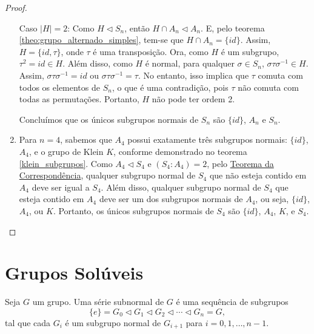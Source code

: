 \documentclass[11pt,openany]{book}
\newenvironment{novo}{
    \color{red}
}{}
\begin{document}
\begin{novo}
\begin{proof}
\begin{enumerate}[label=\alph*)]
        Caso $|H| = 2$: Como $H \triangleleft S_n$, então $H \cap A_n \triangleleft A_n$. E, pelo teorema \ref{theo:grupo_alternado_simples}, tem-se que $H \cap A_n = \{id\}$. Assim, $H = \{id, \tau\}$, onde $\tau$ é uma transposição. Ora, como $H$ é um subgrupo, $\tau^2 = id \in H$. Além disso, como $H$ é normal, para qualquer $\sigma \in S_n$, $\sigma \tau \sigma^{-1} \in H$. Assim, $\sigma \tau \sigma^{-1} = id$ ou $\sigma \tau \sigma^{-1} = \tau$. No entanto, isso implica que $\tau$ comuta com todos os elementos de $S_n$, o que é uma contradição, pois $\tau$ não comuta com todas as permutações. Portanto, $H$ não pode ter ordem 2.

        Concluímos que os únicos subgrupos normais de $S_n$ são $\{id\}$, $A_n$ e $S_n$.

        \item Para $n = 4$, sabemos que $A_4$ possui exatamente três subgrupos normais: $\{id\}$, $A_4$, e o grupo de Klein $K$, conforme demonstrado no teorema \ref{klein_subgrupos}. Como $A_4 \triangleleft S_4$ e $(S_4:A_4) = 2$, pelo \hyperref[theo:teorema_da_correspondencia]{Teorema da Correspondência}, qualquer subgrupo normal de $S_4$ que não esteja contido em $A_4$ deve ser igual a $S_4$. Além disso, qualquer subgrupo normal de $S_4$ que esteja contido em $A_4$ deve ser um dos subgrupos normais de $A_4$, ou seja, $\{id\}$, $A_4$, ou $K$. Portanto, os únicos subgrupos normais de $S_4$ são $\{id\}$, $A_4$, $K$, e $S_4$.
    \end{enumerate}
\end{proof}
\end{novo}

\chapter{Grupos Solúveis}

\begin{definition}
\label{def:serie_subnormal}
    Seja \(G\) um grupo. Uma série subnormal de \(G\) é uma sequência de subgrupos
    \[
    \{e\} = G_0 \triangleleft G_1 \triangleleft G_2 \triangleleft \cdots \triangleleft G_n = G,
    \]
    tal que cada \(G_i\) é um subgrupo normal de \(G_{i+1}\) para \(i=0,1,\dots,n-1\).
\end{definition}





\end{document}
